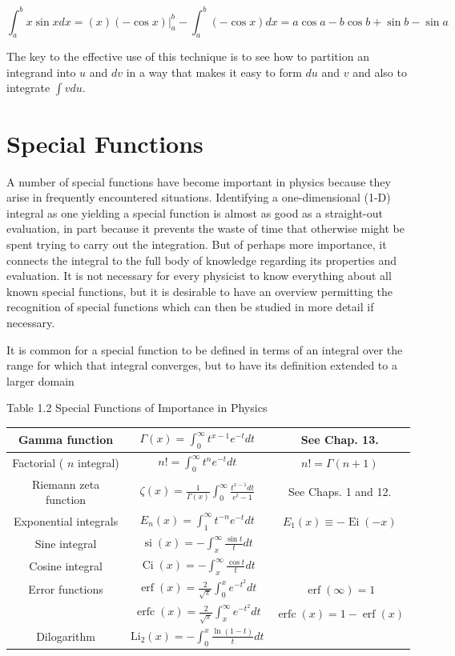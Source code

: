 \documentclass[10pt]{article}
\begin{document}
$$
\int_{a}^{b} x \sin x d x=\left.(x)(-\cos x)\right|_{a} ^{b}-\int_{a}^{b}(-\cos x) d x=a \cos a-b \cos b+\sin b-\sin a
$$

The key to the effective use of this technique is to see how to partition an integrand into $u$ and $d v$ in a way that makes it easy to form $d u$ and $v$ and also to integrate $\int v d u$.

\section*{Special Functions}
A number of special functions have become important in physics because they arise in frequently encountered situations. Identifying a one-dimensional (1-D) integral as one yielding a special function is almost as good as a straight-out evaluation, in part because it prevents the waste of time that otherwise might be spent trying to carry out the integration. But of perhaps more importance, it connects the integral to the full body of knowledge regarding its properties and evaluation. It is not necessary for every physicist to know everything about all known special functions, but it is desirable to have an overview permitting the recognition of special functions which can then be studied in more detail if necessary.

It is common for a special function to be defined in terms of an integral over the range for which that integral converges, but to have its definition extended to a larger domain

Table 1.2 Special Functions of Importance in Physics

\begin{center}
\begin{tabular}{|c|c|c|}
\hline
Gamma function & \( \Gamma(x)=\int_{0}^{\infty} t^{x-1} e^{-t} d t \) & See Chap. 13. \\
\hline
Factorial ( $n$ integral) & \( n!=\int_{0}^{\infty} t^{n} e^{-t} d t \) & $n!=\Gamma(n+1)$ \\
\hline
Riemann zeta function & \( \zeta(x)=\frac{1}{\Gamma(x)} \int_{0}^{\infty} \frac{t^{x-1} d t}{e^{t}-1} \) & See Chaps. 1 and 12. \\
\hline
Exponential integrals & \( E_{n}(x)=\int_{1}^{\infty} t^{-n} e^{-t} d t \) & $E_{1}(x) \equiv-\operatorname{Ei}(-x)$ \\
\hline
Sine integral & \( \operatorname{si}(x)=-\int_{x}^{\infty} \frac{\sin t}{t} d t \) &  \\
\hline
Cosine integral & \( \operatorname{Ci}(x)=-\int_{x}^{\infty} \frac{\cos t}{t} d t \) &  \\
\hline
Error functions & \( \operatorname{erf}(x)=\frac{2}{\sqrt{\pi}} \int_{0}^{x} e^{-t^{2}} d t \) & $\operatorname{erf}(\infty)=1$ \\
\hline
 & \( \operatorname{erfc}(x)=\frac{2}{\sqrt{\pi}} \int_{x}^{\infty} e^{-t^{2}} d t \) & $\operatorname{erfc}(x)=1-\operatorname{erf}(x)$ \\
\hline
Dilogarithm & \( \mathrm{Li}_{2}(x)=-\int_{0}^{x} \frac{\ln (1-t)}{t} d t \) &  \\
\hline
\end{tabular}
\end{center}
\end{document}
